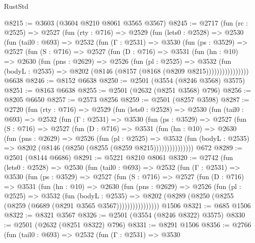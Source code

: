 \begin{lexlean}{RustStd}
\begin{coremodule}
{\begin{coremodule}
{{{{{{{{{{{{{{{{{{{{@8215 := @3603 (@3604 @8210 @8061 @3565 @3567)
@8245 := @2717
    (fun (rc : @2525) =>
    @2527
      (fun (rty : @716) =>
      @2529
        (fun (lets0 : @2528) =>
        @2530
          (fun (tail0 : @693) =>
          @2532
            (fun (Γ : @2531) =>
            @3530
              (fun (ps : @3529) =>
              @2527
                (fun (S : @716) =>
                @2527
                  (fun (D : @716) =>
                  @3531
                    (fun (hn : @10) =>
                    @2630
                      (fun (pns : @2629) =>
                      @2526
                        (fun (pl : @2525) =>
                        @3532
                          (fun (bodyL : @2535) =>
                          @8202 (@8146 (@8157 (@8168 (@8209 @8215))))))))))))))))
    @6638
@8246 := @8152 @6638
@8250 := @2501 (@3554 (@8246 @3568) @3575)
@8251 := @8163 @6638
@8255 := @2501 (@2632 (@8251 @3568) @796)
@8256 := @8205 @6650
@8257 := @2573 @8256
@8259 := @2501 (@8257 @3598)
@8287 := @2720
    (fun (rty : @716) =>
    @2529
      (fun (lets0 : @2528) =>
      @2530
        (fun (tail0 : @693) =>
        @2532
          (fun (Γ : @2531) =>
          @3530
            (fun (ps : @3529) =>
            @2527
              (fun (S : @716) =>
              @2527
                (fun (D : @716) =>
                @3531
                  (fun (hn : @10) =>
                  @2630
                    (fun (pns : @2629) =>
                    @2526
                      (fun (pl : @2525) =>
                      @3532
                        (fun (bodyL : @2535) =>
                        @8202 (@8146 (@8250 (@8255 (@8259 @8215)))))))))))))))
    @672
@8289 := @2501 (@8144 @6686)
@8291 := @5221 @8210 @8061
@8320 := @2742
    (fun (lets0 : @2528) =>
    @2530
      (fun (tail0 : @693) =>
      @2532
        (fun (Γ : @2531) =>
        @3530
          (fun (ps : @3529) =>
          @2527
            (fun (S : @716) =>
            @2527
              (fun (D : @716) =>
              @3531
                (fun (hn : @10) =>
                @2630
                  (fun (pns : @2629) =>
                  @2526
                    (fun (pl : @2525) =>
                    @3532
                      (fun (bodyL : @2535) =>
                      @8202 (@8289 (@8250 (@8255 (@8259 (@6689 (@8291 @3565 @3567))))))))))))))))
    @1506
@8321 := @685 @1506
@8322 := @8321 @3567
@8326 := @2501 (@3554 (@8246 @8322) @3575)
@8330 := @2501 (@2632 (@8251 @8322) @796)
@8331 := @8291 @1506
@8356 := @2766
    (fun (tail0 : @693) =>
    @2532
      (fun (Γ : @2531) =>
      @3530
}}}}}}}}}}}}}}}}}}}}
\end{coremodule}}
\end{coremodule}
\end{lexlean}
